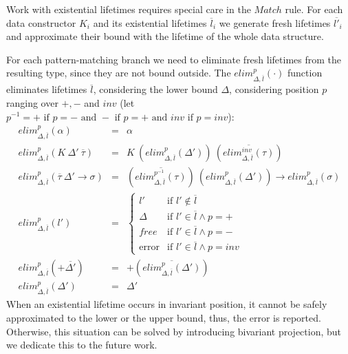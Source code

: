 \documentclass[11pt]{article}
\newcommand{\ap}{~}
\begin{document}
    Work with existential lifetimes requires special care in the $Match$ rule.
    For each data constructor $K_i$ and its existential lifetimes $\overline{l}_i$ we generate fresh lifetimes $\overline{l'}_i$ and approximate their bound with the lifetime of the whole data structure.

    For each pattern-matching branch we need to eliminate fresh lifetimes from the resulting type, since they are not bound outside. %
    The $elim_{\Delta, \overline{l}}^p(\cdot)$ function eliminates lifetimes $\overline{l}$, considering the lower bound $\Delta$, considering position $p$ ranging over $+, -$ and $inv$ (let $p^{-1} = + \text{ if } p = - \text{ and } - \text{ if } p = + \text{ and } inv \text{ if } p = inv$):
    \[
        \begin{array}{lll}
            elim_{\Delta, \overline{l}}^p(\alpha) & = & \alpha \\
            elim_{\Delta, \overline{l}}^p(K\ap \Delta'\ap\overline{\tau}) & = & K\ap \left( elim_{\Delta, \overline{l}}^p(\Delta') \right)\ap\left( \overline{elim_{\Delta, \overline{l}}^{inv}(\tau)} \right) \\
            elim_{\Delta, \overline{l}}^p(\overline{\tau}~\Delta'\to\sigma) & = & \left( \overline{elim_{\Delta, \overline{l}}^{p^{-1}}(\tau)} \right)~\left( elim_{\Delta, \overline{l}}^p(\Delta') \right)\to elim_{\Delta, \overline{l}}^{p}(\sigma) \\
            elim_{\Delta, \overline{l}}^{p}(l') & = &
            \begin{cases}
                l'     & \text{if } l' \not\in\overline{l} \\
                \Delta & \text{if } l' \in \overline{l} \land p = + \\
                free   & \text{if } l' \in \overline{l} \land p = - \\
                \text{error}  & \text{if } l' \in \overline{l} \land p = inv
            \end{cases} \\
            elim_{\Delta, \overline{l}}^{p}(+\overline{\Delta'}) & = & +\left( \overline{elim_{\Delta, \overline{l}}^{p}(\Delta')} \right) \\
            elim_{\Delta, \overline{l}}^{p}(\Delta') & = & \Delta'
        \end{array}
    \]
    When an existential lifetime occurs in invariant position, it cannot be safely approximated to the lower or the upper bound, thus, the error is reported.
    Otherwise, this situation can be solved by introducing bivariant projection, but we dedicate this to the future work. %
\end{document}
